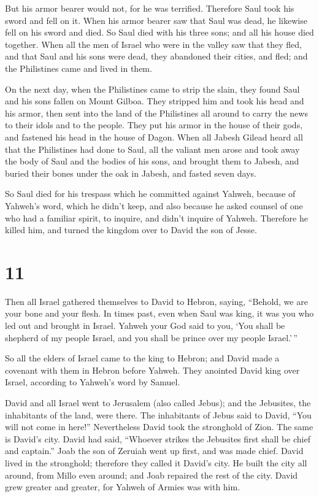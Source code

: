 But his armor bearer would not, for he was terrified. Therefore Saul
took his sword and fell on it.  When his armor bearer saw
that Saul was dead, he likewise fell on his sword and died. 
So Saul died with his three sons; and all his house died together.
 When all the men of Israel who were in the valley saw that
they fled, and that Saul and his sons were dead, they abandoned their
cities, and fled; and the Philistines came and lived in them.

 On the next day, when the Philistines came to strip the
slain, they found Saul and his sons fallen on Mount Gilboa. 
They stripped him and took his head and his armor, then sent into the
land of the Philistines all around to carry the news to their idols and
to the people.  They put his armor in the house of their
gods, and fastened his head in the house of Dagon.  When
all Jabesh Gilead heard all that the Philistines had done to Saul,
 all the valiant men arose and took away the body of Saul
and the bodies of his sons, and brought them to Jabesh, and buried their
bones under the oak in Jabesh, and fasted seven days.

 So Saul died for his trespass which he committed against
Yahweh, because of Yahweh's word, which he didn't keep, and also because
he asked counsel of one who had a familiar spirit, to inquire,
 and didn't inquire of Yahweh. Therefore he killed him, and
turned the kingdom over to David the son of Jesse.

\hypertarget{section-10}{%
\section{11}\label{section-10}}

 Then all Israel gathered themselves to David to Hebron,
saying, ``Behold, we are your bone and your flesh.  In times
past, even when Saul was king, it was you who led out and brought in
Israel. Yahweh your God said to you, `You shall be shepherd of my people
Israel, and you shall be prince over my people Israel.'\,''

 So all the elders of Israel came to the king to Hebron; and
David made a covenant with them in Hebron before Yahweh. They anointed
David king over Israel, according to Yahweh's word by Samuel.

 David and all Israel went to Jerusalem (also called Jebus);
and the Jebusites, the inhabitants of the land, were there. 
The inhabitants of Jebus said to David, ``You will not come in here!''
Nevertheless David took the stronghold of Zion. The same is David's
city.  David had said, ``Whoever strikes the Jebusites first
shall be chief and captain.'' Joab the son of Zeruiah went up first, and
was made chief.  David lived in the stronghold; therefore
they called it David's city.  He built the city all around,
from Millo even around; and Joab repaired the rest of the city.
 David grew greater and greater, for Yahweh of Armies was
with him.

